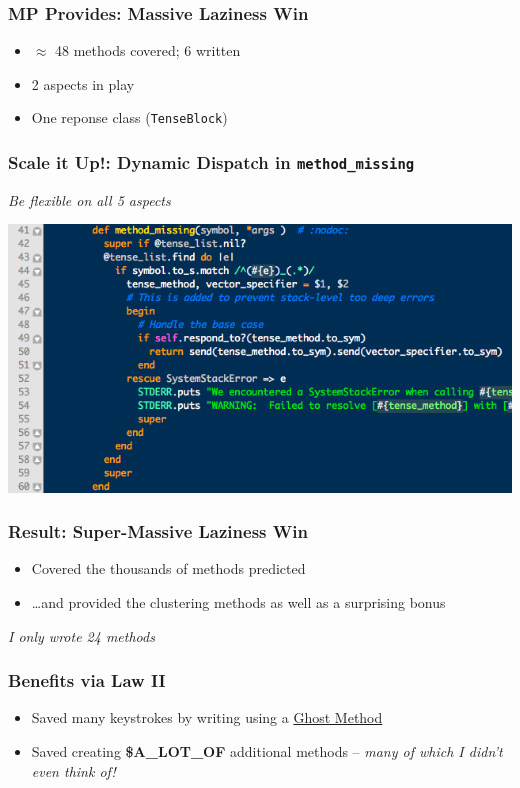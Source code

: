 \documentclass[slidestop,compress,mathserif]{beamer}
\begin{document}
\begin{frame}
	\frametitle{MP Provides:  Massive Laziness Win}
	\begin{itemize}
		\item $\approx$ 48 methods covered; 6 written
		\pause
		\item 2 aspects in play
		\pause
		\item One reponse class (\texttt{TenseBlock})
	\end{itemize}
\end{frame}

\begin{frame}
	\frametitle{Scale it Up!: Dynamic Dispatch in \texttt{method\_missing}}
	\begin{center}
		\emph{Be flexible on all 5 aspects}
	\end{center}
	\includegraphics[scale=0.45]{img/lv_mm.png}
\end{frame}

\begin{frame}
	\frametitle{Result:  Super-Massive Laziness Win}
	\begin{itemize}
		\item Covered the thousands of methods predicted
		\pause
		\item \ldots and provided the clustering methods as well as a surprising bonus
	\end{itemize}
	\pause
	\vskip 0.5cm
	\emph{I only wrote 24 methods}
\end{frame}

\begin{frame}
	\frametitle{Benefits via Law II}
	\begin{itemize}
		\item Saved many keystrokes by writing using a \underline{Ghost Method}
		\pause
		\item Saved creating \textbf{\$A\_LOT\_OF} additional methods -- \emph{many of which I didn't even think of!}
	\end{itemize}
\end{frame}
\end{document}
